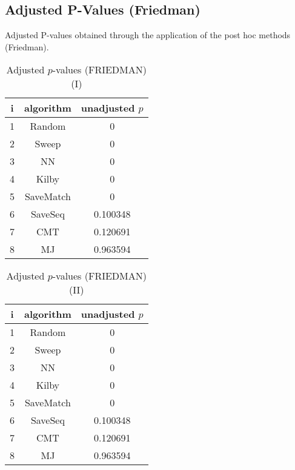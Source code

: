 \documentclass[a4paper,10pt]{article}
\begin{document}
\begin{landscape}
\section{Adjusted P-Values (Friedman)}


Adjusted P-values obtained through the application of the post hoc methods (Friedman).

\begin{table}[!htp]
\centering\small
\begin{tabular}{ccc}
i&algorithm&unadjusted $p$\\
\hline1&Random&0\\2&Sweep&0\\3&NN&0\\4&Kilby&0\\5&SaveMatch&0\\6&SaveSeq&0.100348\\7&CMT&0.120691\\8&MJ&0.963594\\\hline
\end{tabular}
\caption{Adjusted $p$-values (FRIEDMAN) (I)}
\end{table}
\begin{table}[!htp]
\centering\small
\begin{tabular}{ccc}
i&algorithm&unadjusted $p$\\
\hline1&Random&0\\2&Sweep&0\\3&NN&0\\4&Kilby&0\\5&SaveMatch&0\\6&SaveSeq&0.100348\\7&CMT&0.120691\\8&MJ&0.963594\\\hline
\end{tabular}
\caption{Adjusted $p$-values (FRIEDMAN) (II)}
\end{table}

\newpage
\end{landscape}
\end{document}
